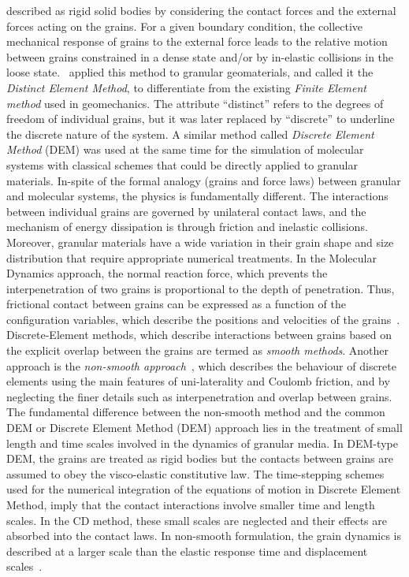 described as rigid solid bodies by considering the contact forces and the 
external forces acting on the grains. For a given boundary condition, the 
collective mechanical response of grains to the external force leads to the 
relative motion between grains constrained in a dense state and/or by 
in-elastic collisions in the loose state.~\citet{Cundall1979} applied this 
method to granular geomaterials, and called it the \textit{Distinct Element 
Method}, to differentiate from the existing \textit{Finite Element method} used 
in geomechanics. The attribute ``distinct'' refers to the degrees of freedom of 
individual grains, but it was later replaced by ``discrete'' to underline 
the discrete nature of the system. A similar method called \textit{Discrete 
Element Method} (DEM) was used at the same time for the simulation of molecular 
systems with classical schemes that could be directly applied to granular 
materials. In-spite of the formal analogy (grains and force laws) between 
granular and molecular systems, the physics is fundamentally different. The 
interactions between individual grains are governed by unilateral contact laws, 
and the mechanism of energy dissipation is through friction and inelastic 
collisions. Moreover, granular materials have a wide variation in their 
grain shape and size distribution that require appropriate numerical 
treatments. In the Molecular Dynamics approach, the normal reaction force, 
which prevents the interpenetration of two grains is proportional to the depth 
of penetration. Thus, frictional contact between grains can be expressed 
as a function of the configuration variables, which describe the positions and 
velocities of the grains~\citep{Radjai2011}. Discrete-Element methods, which 
describe interactions between grains based on the explicit overlap between the 
grains are termed as \textit{smooth methods}. Another approach is the 
\textit{non-smooth approach}~\citep{Jean1999}, which describes the behaviour of 
discrete elements using the main features of uni-laterality and Coulomb 
friction, and by neglecting the finer details such as interpenetration and 
overlap between grains. The fundamental difference 
between the non-smooth method and the common DEM or Discrete Element Method 
(DEM) approach lies in the treatment of small length and time scales involved 
in the dynamics of granular media. In DEM-type DEM, the grains are treated 
as rigid bodies but the contacts between grains are assumed to obey the 
visco-elastic constitutive law. The time-stepping schemes used for the 
numerical integration of the equations of motion in Discrete Element Method, 
imply that the contact interactions involve smaller time and length scales. In 
the CD method, these small scales are neglected and their effects are absorbed 
into the contact laws. In non-smooth formulation, the grain dynamics is 
described at a larger scale than the elastic response time and displacement 
scales~\citep{Jean1999, Radjai2009}. 


